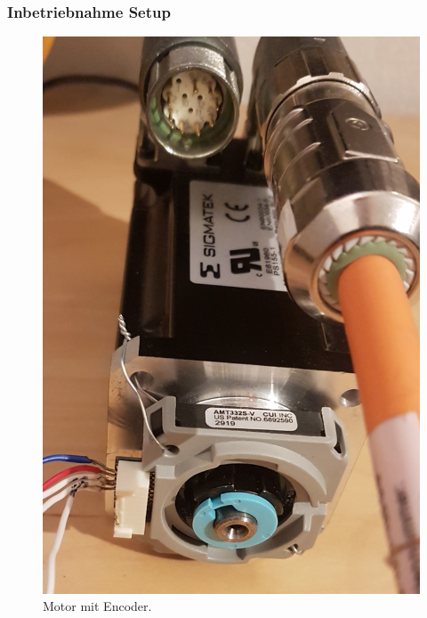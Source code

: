 \subsubsection{Inbetriebnahme Setup}\label{Appendix:ABN_Setup}

\begin{figure}[H]
	\centering
	\includegraphics[angle = 270, width=\textwidth]{graphics/4_Encoder_Motor}
	\caption{Motor mit Encoder.}
	\label{fig:4_Encoder_Motor}
\end{figure}

